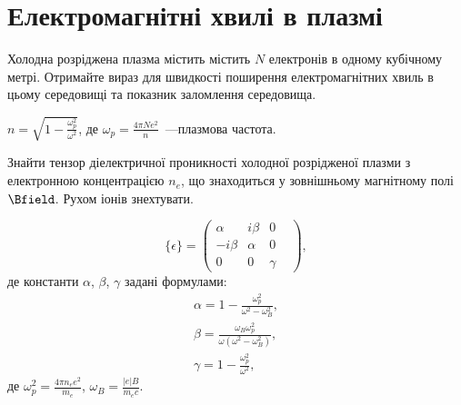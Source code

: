 

\section{Електромагнітні хвилі в плазмі}

\begin{problem}
Холодна розріджена плазма містить містить $N$ електронів в одному кубічному метрі. Отримайте вираз для швидкості поширення електромагнітних хвиль в цьому середовищі та показник заломлення середовища.
\begin{solution}
	$n = \sqrt{1 - \frac{\omega_p^2}{\omega^2}}$, де $\omega_p = \frac{4\pi N e^2}{n}$~---плазмова частота.
\end{solution}
\end{problem}


\begin{problem}\label{prb:plasma}
Знайти тензор діелектричної проникності холодної розрідженої плазми з електронною концентрацією  $n_e$, що знаходиться у зовнішньому магнітному полі $\Bfield$. Рухом іонів знехтувати.
\begin{solution}
	\begin{equation*}
		\{ \epsilon \}  = \left( {\begin{array}{*{20}{c}}
				\alpha       & {i\beta } & 0      & \\
				{ - i\beta } & \alpha    & 0      & \\
				0            & 0         & \gamma &
			\end{array}} \right),
	\end{equation*}
	де константи $\alpha$, $\beta$, $\gamma$ задані формулами:
	\begin{align*}
		\alpha =  1 - \frac{\omega_p^2}{\omega ^2 - \omega _B^2},           \\
		\beta = \frac{\omega_B\omega_p^2}{\omega(\omega ^2 - \omega _B^2)}, \\
		\gamma = 1 - \frac{\omega _p^2}{\omega ^2},
	\end{align*}
	де $\omega _p^2 = \frac{4\pi n_e e^2}{m_e}$, $\omega_B = \frac{\left| e \right|B}{m_ec}$.
\end{solution}
\end{problem}

